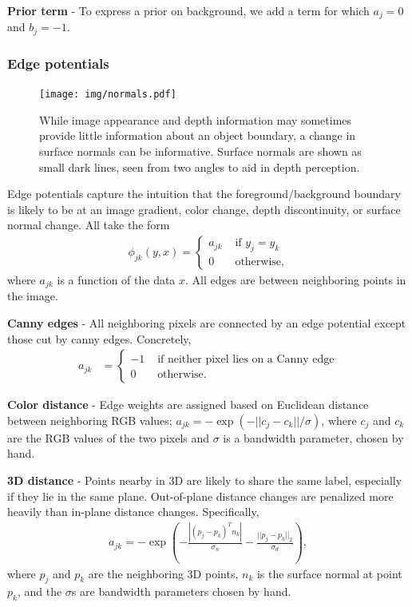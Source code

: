 \documentclass[graybox]{svmult}
\begin{document}
\textbf{Prior term} - To express a prior on background, we add a term for which $a_j = 0$ and $b_j = -1$.

\subsubsection{Edge potentials}

\begin{figure}
  \texttt{[image: img/normals.pdf]}
  \sidecaption[t]
  \caption{While image appearance and depth information may sometimes provide little information about an object boundary, a change in surface normals can be informative. Surface normals are shown as small dark lines, seen from two angles to aid in depth perception.}
  \label{fig:normals}
\end{figure}

Edge potentials capture the intuition that the foreground/background boundary is likely to be at an image gradient, color change, depth discontinuity, or surface normal change.  All take the form
\begin{align*}
  \phi_{jk}(y, x) =
  \left\{
  \begin{array}{rl}
    a_{jk} & \mbox{ if } y_j = y_k \\
    0 & \mbox{ otherwise,}
  \end{array}
  \right.
\end{align*}
where $a_{jk}$ is a function of the data $x$.  All edges are between neighboring points in the image.

\textbf{Canny edges} - All neighboring pixels are connected by an edge potential except those cut by canny edges.  Concretely,
\begin{align*}
  a_{jk} & =
  \left\{
  \begin{array}{rl}
    -1 & \mbox{ if neither pixel lies on a Canny edge} \\
    0 & \mbox{ otherwise.}
  \end{array}
  \right.
\end{align*}


\textbf{Color distance} - Edge weights are assigned based on Euclidean distance between neighboring RGB values; $a_{jk} = - \exp(-||c_j - c_k|| / \sigma)$, where $c_j$ and $c_k$ are the RGB values of the two pixels and $\sigma$ is a bandwidth parameter, chosen by hand.

\textbf{3D distance} - Points nearby in 3D are likely to share the same label, especially if they lie in the same plane.  Out-of-plane distance changes are penalized more heavily than in-plane distance changes.  Specifically,
\begin{align*}
  a_{jk} = -\exp \left( -\frac{|(p_j - p_k)^T n_k|}{\sigma_n} - \frac{||p_j - p_k||_2}{\sigma_d} \right),
\end{align*}
where $p_j$ and $p_k$ are the neighboring 3D points, $n_k$ is the surface normal at point $p_k$, and the $\sigma$s are bandwidth parameters chosen by hand.
\end{document}
